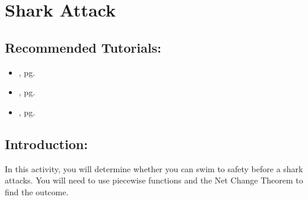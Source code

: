 \section{Shark Attack}
\label{sec:shark_attack}	

\subsection*{Recommended Tutorials:}
\begin{itemize}[noitemsep]
	\item {}, pg. \pageref{chp:assignment_operator}
	\item {}, pg. \pageref{chp:equation_solvers}
	\item {}, pg. \pageref{chp:definite_and_indefinite_Integrals}
\end{itemize}

\subsection*{Introduction:}

In this activity, you will determine whether you can swim to safety before a shark attacks. You will need to use piecewise functions and the Net Change Theorem to find the outcome. 

